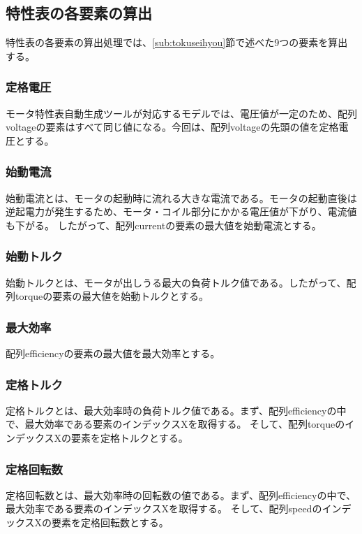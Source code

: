 \subsection{特性表の各要素の算出}\label{sub:youso_mortoku}
特性表の各要素の算出処理では、\ref{sub:tokuseihyou}節で述べた9つの要素を算出する。

\subsubsection{定格電圧}\label{sub:sub:dennatu}
モータ特性表自動生成ツールが対応するモデルでは、電圧値が一定のため、配列voltageの要素はすべて同じ値になる。今回は、配列voltageの先頭の値を定格電圧とする。

\subsubsection{始動電流}\label{sub:sub:sidouden}
始動電流とは、モータの起動時に流れる大きな電流である。モータの起動直後は逆起電力が発生するため、モータ・コイル部分にかかる電圧値が下がり、電流値も下がる。
したがって、配列currentの要素の最大値を始動電流とする。

\subsubsection{始動トルク}\label{sub:sub:teidoutoruku}
始動トルクとは、モータが出しうる最大の負荷トルク値である。したがって、配列torqueの要素の最大値を始動トルクとする。

\subsubsection{最大効率}\label{sub:sub:saidaikouritu}
配列efficiencyの要素の最大値を最大効率とする。

\subsubsection{定格トルク}\label{sub:sub:teikakutoruku}
定格トルクとは、最大効率時の負荷トルク値である。まず、配列efficiencyの中で、最大効率である要素のインデックスXを取得する。
そして、配列torqueのインデックスXの要素を定格トルクとする。

\subsubsection{定格回転数}\label{sub:sub:teikakukaiten}
定格回転数とは、最大効率時の回転数の値である。まず、配列efficiencyの中で、最大効率である要素のインデックスXを取得する。
そして、配列speedのインデックスXの要素を定格回転数とする。

